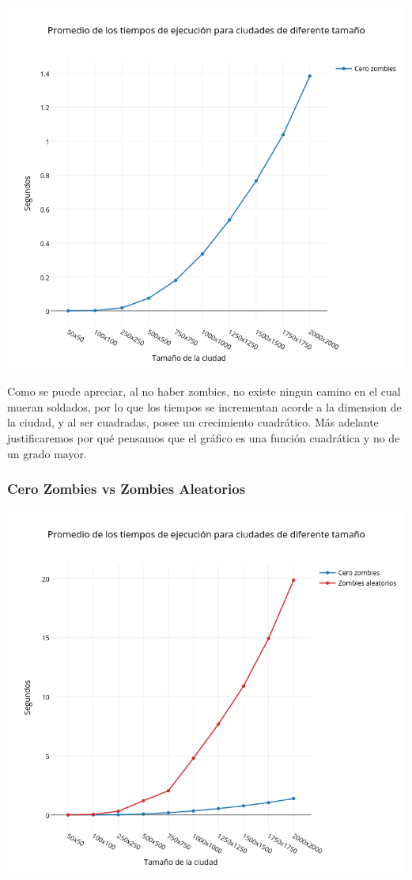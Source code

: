 \includegraphics[width=15cm,keepaspectratio=yes]{imagenes/ej2/czneto.png}

Como se puede apreciar, al no haber zombies, no existe ningun camino en el cual mueran soldados, por lo que los tiempos se incrementan acorde a la dimension de la ciudad, y al ser cuadradas, posee un crecimiento cuadrático. Más adelante justificaremos por qué pensamos que el gráfico es una función cuadrática y no de un grado mayor.

\newpage

\subsubsection*{Cero Zombies vs Zombies Aleatorios}

\includegraphics[width=15cm,keepaspectratio=yes]{imagenes/ej2/czyza.png}

